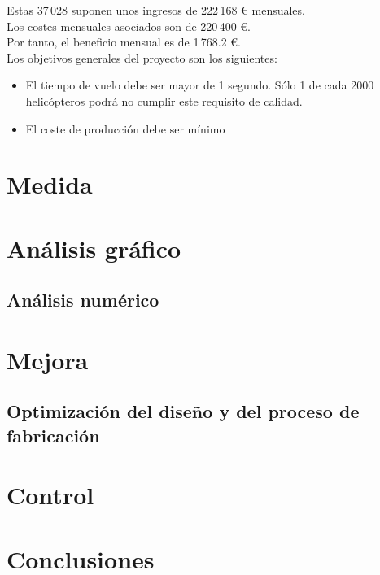 \documentclass[12pt,a4paper,twoside,openright,titlepage,final]{article}
\begin{document}
Estas 37\,028 suponen unos ingresos de 222\,168 € mensuales.\\

Los costes mensuales asociados son de 220\,400 €.\\

Por tanto, el beneficio mensual es de 1\,768.2 €.\\

Los objetivos generales del proyecto son los siguientes:

\begin{itemize}
	\item El tiempo de vuelo debe ser mayor de 1 segundo. Sólo 1 de cada 2000 helicópteros podrá no cumplir este requisito de calidad.
	\item El coste de producción debe ser mínimo
\end{itemize} 



\section{Medida}

\section{Análisis gráfico}

\subsection{Análisis numérico}

\section{Mejora}

\subsection{Optimización del diseño y del proceso de fabricación}

\section{Control}

\section{Conclusiones}
\end{document}

